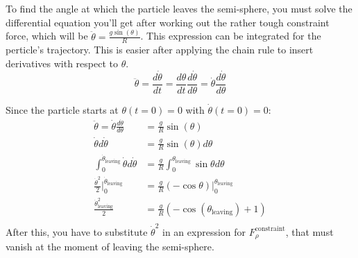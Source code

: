 \documentclass[11pt, a4paper, twoside]{article}
\begin{document}
\begin{enumerate}
	To find the angle at which the particle leaves the semi-sphere, you must solve the differential equation you'll get after working out the rather tough constraint force, which will be $\ddot{\theta} = \frac{g \sin(\theta)}{R}$.
	This expression can be integrated for the perticle's trajectory.
	This is easier after applying the chain rule to insert derivatives with respect to \(\theta\).
	$$
		\ddot{\theta} 
		= \frac{d \dot{\theta} }{d t} 
		= \frac{d \theta}{d t} \frac{d \dot{\theta}}{d \theta} 
		= \dot{\theta} \frac{d \dot{\theta}}{d \theta}
	$$

	Since the particle starts at $\theta(t=0) = 0$ with $\dot{\theta}(t=0) = 0$:
	$$
	\begin{aligned}
		\ddot{\theta} = \dot{\theta} \frac{d \dot{\theta}}{d \theta}
		&= \frac{g}{R} \sin(\theta)\\
		\dot{\theta} d \dot{\theta}
		&= \frac{g}{R} \sin(\theta) d \theta \\
		\int_0^{\dot{\theta}_\mathrm{leaving}} \dot{\theta} d \dot{\theta}
		&= \frac{g}{R} \int_0^{\theta_\mathrm{leaving}} \sin{\theta} d \theta\\
		\frac{\dot{\theta}^2}{2} \bigg|_0^{\dot{\theta}_\mathrm{leaving}}
		&= \frac{g}{R} (-\cos{\theta}) \bigg|_0^{\theta_\mathrm{leaving}}\\
		\frac{\dot{\theta}_\mathrm{leaving}^2}{2}
		&= \frac{g}{R} (-\cos(\theta_\mathrm{leaving}) + 1)\\
	\end{aligned}
	$$
	After this, you have to substitute $\dot{\theta}^2$ in an expression for $F^\mathrm{constraint}_{\rho}$, that must vanish at the moment of leaving the semi-sphere.


\end{enumerate}
\end{document}
